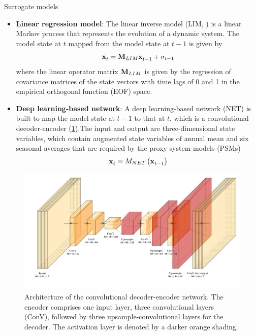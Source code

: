 \documentclass[final]{beamer}
\newlength{\colwidth}
\begin{document}
\begin{frame}[t]
\begin{columns}[t]
\begin{column}{\colwidth}
    			\begin{block}{Surrogate models}
    				\begin{itemize}
    				    \item \textbf{Linear regression model}: The linear inverse model (LIM, \cite{penland_optimal-growth_1995}) is a linear Markov process that represents the evolution of a dynamic system. The model state at $t$ mapped from the model state at $t-1$ is given by
                        \begin{equation}
                            {\bf{x}}_t^{} = {{\bf{M}}_{LIM}}{\bf{x}}_{t - 1}^{} + {\sigma _{t - 1}}
                        \end{equation}
                        where the linear operator matrix ${{\bf{M}}_{LIM}}$ is given by the regression of covariance matrices of the state vectors with time lags of 0 and 1 in the empirical orthogonal function (EOF) space.
                        \item \textbf{Deep learning-based network}: A deep learning-based network (NET) is built to map the model state at $t-1$ to that at $t$, which is a convolutional decoder-encoder (\cref{fig1}).The input and output are three-dimensional state variables, which contain augmented state variables of annual mean and six seasonal averages that are required by the proxy system models (PSMs)
                        \begin{equation}
                            {\bf{x}}_t^{} = {M_{NET}}\left( {{\bf{x}}_{t - 1}^{}} \right)   
                        \end{equation}
    				\end{itemize}
                    
                    \begin{figure}
                        \begin{minipage}[t]{0.8\textwidth}
                            \centerline{\includegraphics[width=1\textwidth]{figure/Figure1.pdf}}
                            \caption{Architecture of the convolutional decoder-encoder network. The encoder comprises one input layer, three convolutional layers (ConV), followed by three upsample-convolutional layers for the decoder. The activation layer is denoted by a darker orange shading.}\label{fig1}
                        \end{minipage}
                    \end{figure}						
    			\end{block}
    

\end{column}
\end{columns}
\end{frame}
\end{document}

